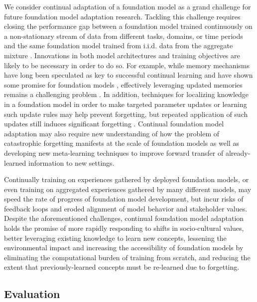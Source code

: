 We consider continual adaptation of a foundation model as a grand challenge for future foundation model adaptation research. Tackling this challenge requires closing the performance gap between a foundation model trained continuously on a non-stationary stream of data from different tasks, domains, or time periods and the same foundation model trained from i.i.d. data from the aggregate mixture \citep{lopezpaz2017gradient}. Innovations in both model architectures and training objectives are likely to be necessary in order to do so. For example, while memory mechanisms have long been speculated as key to successful continual learning \citep{french1999catastrophic} and have shown some promise for foundation models \citep{lewis2020retrieval,guu2020realm,borgeaud2021improving}, effectively leveraging updated memories remains a challenging problem \citep{zhang2021situatedqa}. In addition, techniques for localizing knowledge in a foundation model in order to make targeted parameter updates \citep{Dai2021KnowledgeNI} or learning such update rules \citep{decao2021editing,mitchell2021model} may help prevent forgetting, but repeated application of such updates still induces significant forgetting \citep{hase2021language}. Continual foundation model adaptation may also require new understanding of how the problem of catastrophic forgetting manifests at the scale of foundation models as well as developing new meta-learning techniques \cite{schmidhuber1987evolutionary,santoro2016meta,finn2017modelagnostic} to improve forward transfer of already-learned information to new settings.

Continually training on experiences gathered by deployed foundation models, or even training on aggregated experiences gathered by many different models, may speed the rate of progress of foundation model development, but incur risks of feedback loops and eroded alignment of model behavior and stakeholder values. Despite the aforementioned challenges, continual foundation model adaptation holds the promise of more rapidly responding to shifts in socio-cultural values, better leveraging existing knowledge to learn new concepts, lessening the environmental impact and increasing the accessibility of foundation models by eliminating the computational burden of training from scratch, and reducing the extent that previously-learned concepts must be re-learned due to forgetting.

\newsection
\subsection{Evaluation}
\label{sec:evaluation}

